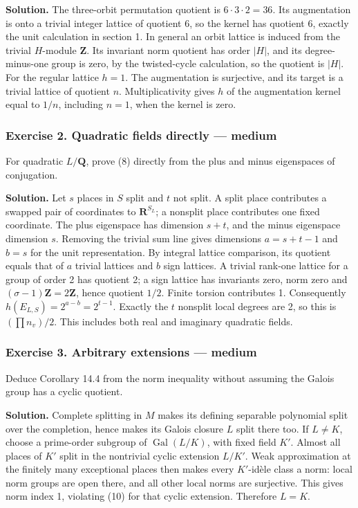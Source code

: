 \documentclass[11pt,a4paper]{article}
\begin{document}
\textbf{Solution.} The three-orbit permutation quotient is
\(6\cdot3\cdot2=36\). Its augmentation is onto a trivial integer lattice
of quotient 6, so the kernel has quotient 6, exactly the unit
calculation in section 1. In general an orbit lattice is induced from
the trivial \(H\)-module \(\mathbf Z\). Its invariant norm quotient has
order \(|H|\), and its degree-minus-one group is zero, by the
twisted-cycle calculation, so the quotient is \(|H|\). For the regular
lattice \(h=1\). The augmentation is surjective, and its target is a
trivial lattice of quotient \(n\). Multiplicativity gives \(h\) of the
augmentation kernel equal to \(1/n\), including \(n=1\), when the kernel
is zero.

\subsubsection{Exercise 2. Quadratic fields directly ---
medium}\label{exercise-2.-quadratic-fields-directly-medium}

For quadratic \(L/\mathbf Q\), prove (8) directly from the plus and
minus eigenspaces of conjugation.

\textbf{Solution.} Let \(s\) places in \(S\) split and \(t\) not split.
A split place contributes a swapped pair of coordinates to
\(\mathbf R^{S_L}\); a nonsplit place contributes one fixed coordinate.
The plus eigenspace has dimension \(s+t\), and the minus eigenspace
dimension \(s\). Removing the trivial sum line gives dimensions
\(a=s+t-1\) and \(b=s\) for the unit representation. By integral lattice
comparison, its quotient equals that of \(a\) trivial lattices and \(b\)
sign lattices. A trivial rank-one lattice for a group of order 2 has
quotient 2; a sign lattice has invariants zero, norm zero and
\((\sigma-1)\mathbf Z=2\mathbf Z\), hence quotient \(1/2\). Finite
torsion contributes 1. Consequently \(h(E_{L,S})=2^{a-b}=2^{t-1}\).
Exactly the \(t\) nonsplit local degrees are 2, so this is
\((\prod n_v)/2\). This includes both real and imaginary quadratic
fields.

\subsubsection{Exercise 3. Arbitrary extensions ---
medium}\label{exercise-3.-arbitrary-extensions-medium}

Deduce Corollary 14.4 from the norm inequality without assuming the
Galois group has a cyclic quotient.

\textbf{Solution.} Complete splitting in \(M\) makes its defining
separable polynomial split over the completion, hence makes its Galois
closure \(L\) split there too. If \(L\ne K\), choose a prime-order
subgroup of \(\operatorname{Gal}(L/K)\), with fixed field \(K'\). Almost
all places of \(K'\) split in the nontrivial cyclic extension \(L/K'\).
Weak approximation at the finitely many exceptional places then makes
every \(K'\)-idèle class a norm: local norm groups are open there, and
all other local norms are surjective. This gives norm index 1, violating
(10) for that cyclic extension. Therefore \(L=K\).
\end{document}

